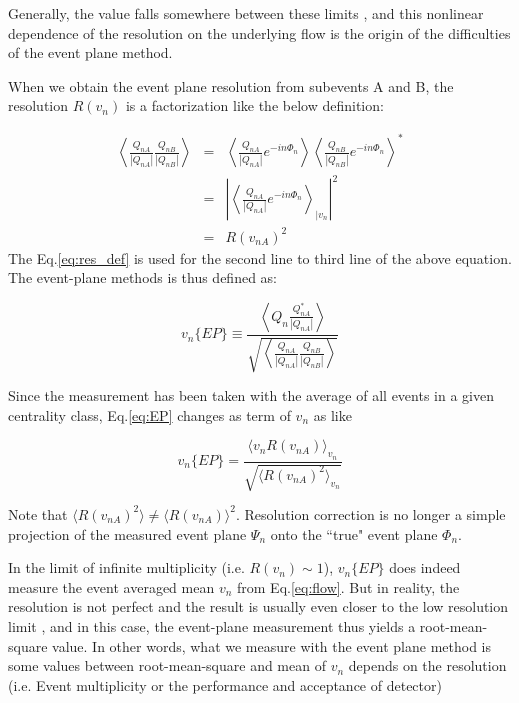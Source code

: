 	Generally, the value falls somewhere between these limits \cite{Luzum:2013yya}, and this nonlinear dependence of the resolution on the underlying flow is the origin of the difficulties of the event plane method.
	
	When we obtain the event plane resolution from subevents A and B, the resolution $R(v_n)$ is a factorization like the below  definition:
	
	\begin{eqnarray}
		\left \langle \frac{Q_{nA}}{|Q_{nA}|}  \frac{Q_{nB}}{|Q_{nB}|} \right \rangle &=&  \left \langle \frac{Q_{nA}}{|Q_{nA}|} e^{-in\Phi_n} \right \rangle \left \langle \frac{Q_{nB}}{|Q_{nB}|} e^{-in\Phi_n} \right \rangle^{*} \\
		&=& \left |   \left \langle   \frac{Q_{nA}}{|Q_{nA}|} e^{-in\Phi_n}  \right \rangle _{|v_n} \right | ^{2} \\ 
		&=&  R(v_{nA})^2
	\end{eqnarray}
	The Eq.\ref{eq:res_def} is used for the second line to third line of the above equation. The event-plane methods is thus defined as:
	
	\begin{equation}
		v_n\{EP\} \equiv \frac{\left \langle Q_n \frac{Q_{nA}^*}{|Q_{nA}|} \right \rangle }{\sqrt{\left \langle  \frac{Q_{nA}}{|Q_{nA}|}  \frac{Q_{nB}}{|Q_{nB}|} \right \rangle }}
		\label{eq:EP}
	\end{equation}
	\smallskip
	
	Since the measurement has been taken with the average of all events in a given centrality class, Eq.\ref{eq:EP} changes as term of $v_n$ as like
	
	\begin{equation}
		v_n\{EP\} = \frac{\langle v_n R(v_{nA})\rangle _{v_n}}{\sqrt{\langle R(v_{nA})^2 \rangle _{v_n} }}
	\end{equation}
	\smallskip 
	
	Note that $\langle R(v_{nA})^2 \rangle \neq \langle R(v_{nA})\rangle ^2$. Resolution correction is no longer a simple projection of the measured event plane $\Psi_n$ onto the ``true" event plane $\Phi_n$.
	
	In the limit of infinite multiplicity (i.e. $R(v_n) \sim 1$), $v_n\{EP\}$ does indeed measure the event averaged mean $v_n$ from Eq.\ref{eq:flow}. But in reality, the resolution is not perfect and the result is usually even closer to the low resolution limit \cite{Alver:2008zza}, and in this case, the event-plane measurement thus yields a root-mean-square value. In other words, what we measure with the event plane method is some values between root-mean-square and mean of $v_n$ depends on the resolution (i.e. Event multiplicity or the performance and acceptance of detector)
	
